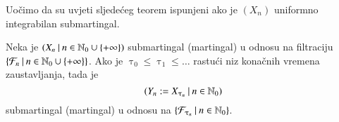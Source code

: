 Uo\v cimo da su uvjeti sljede\' ceg teorem ispunjeni ako je $(X_n)$ uniformno integrabilan submartingal.

\begin{tm}  \label{tm:25.10}
    Neka je $({X_n} \: | \: {n \in \mathbb{N}_0 \cup \{+ \infty\}})$ submartingal (martingal) u odnosu na filtraciju $\{{\mathcal{F}_n} \: | \: {n \in \mathbb{N}_0 \cup \{+ \infty\}}\}$.
    Ako je $\uptau_0 \leq \uptau_1 \leq \ldots$ rastu\' ci niz kona\v cnih vremena zaustavljanja, tada je
    \begin{equation*}
        ({Y_n := X_{\uptau_n}} \: | \: {n \in \mathbb{N}_0})
    \end{equation*}
    submartingal (martingal) u odnosu na $\{{\mathcal{F}_{\uptau_n}} \: | \: {n \in \mathbb{N}_0}\}$.
\end{tm}